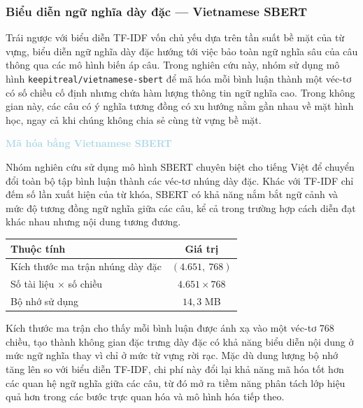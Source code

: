 \subsubsection{Biểu diễn ngữ nghĩa dày đặc --- Vietnamese SBERT}

Trái ngược với biểu diễn TF-IDF vốn chủ yếu dựa trên tần suất bề mặt của từ vựng, biểu diễn ngữ nghĩa dày đặc hướng tới việc bảo toàn ngữ nghĩa sâu của câu thông qua các mô hình biến áp câu. Trong nghiên cứu này, nhóm sử dụng mô hình \texttt{keepitreal/vietnamese-sbert} để mã hóa mỗi bình luận thành một véc-tơ có số chiều cố định nhưng chứa hàm lượng thông tin ngữ nghĩa cao. Trong không gian này, các câu có ý nghĩa tương đồng có xu hướng nằm gần nhau về mặt hình học, ngay cả khi chúng không chia sẻ cùng từ vựng bề mặt.

\vspace{0.5em}
\noindent\textcolor{lightblue}{\textbf{Mã hóa bằng Vietnamese SBERT}}\par
\vspace{0.5em}
Nhóm nghiên cứu sử dụng mô hình SBERT chuyên biệt cho tiếng Việt để chuyển đổi toàn bộ tập bình luận thành các véc-tơ nhúng dày đặc. Khác với TF-IDF chỉ đếm số lần xuất hiện của từ khóa, SBERT có khả năng nắm bắt ngữ cảnh và mức độ tương đồng ngữ nghĩa giữa các câu, kể cả trong trường hợp cách diễn đạt khác nhau nhưng nội dung tương đương.

\begin{center}
\renewcommand{\arraystretch}{1.4}
\begin{tabularx}{0.7\textwidth}{|X|c|}
\hline
\rowcolor[HTML]{E8E8E8}
\textbf{Thuộc tính} & \textbf{Giá trị} \\
\hline
Kích thước ma trận nhúng dày đặc & $(4.651,\ 768)$ \\
\hline
Số tài liệu $\times$ số chiều & $4.651 \times 768$ \\
\hline
Bộ nhớ sử dụng & $14,3$ MB \\
\hline
\end{tabularx}
\end{center}

Kích thước ma trận cho thấy mỗi bình luận được ánh xạ vào một véc-tơ 768 chiều, tạo thành không gian đặc trưng dày đặc có khả năng biểu diễn nội dung ở mức ngữ nghĩa thay vì chỉ ở mức từ vựng rời rạc. Mặc dù dung lượng bộ nhớ tăng lên so với biểu diễn TF-IDF, chi phí này đổi lại khả năng mã hóa tốt hơn các quan hệ ngữ nghĩa giữa các câu, từ đó mở ra tiềm năng phân tách lớp hiệu quả hơn trong các bước trực quan hóa và mô hình hóa tiếp theo.

